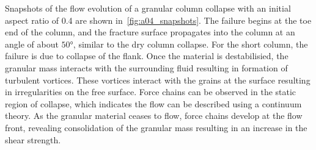 Snapshots of the flow evolution of a granular column collapse with an initial 
aspect ratio of 0.4 are shown in~\cref{fig:a04_snapshots}. The failure begins 
at the toe end of the column, and the fracture surface propagates into the 
column at an angle of about $50\si{\degree}$, similar to the dry column 
collapse. For the 
short column, the failure is due to collapse of the flank. Once the material 
is destabilisied, the granular mass interacts with the surrounding fluid 
resulting in formation of turbulent vortices. These vortices interact with the 
grains at the surface resulting in irregularities on the free surface. Force 
chains can be observed in the static region of collapse, which indicates the 
flow can be described using a continuum theory. As the granular material ceases 
to flow, 
force chains develop at the flow front, revealing consolidation of the granular 
mass resulting in an increase in the shear strength. 

